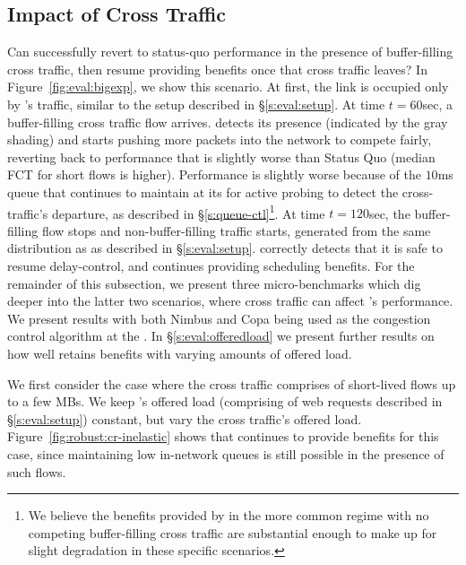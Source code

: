 \subsection{Impact of Cross Traffic}\label{s:robust:cross}



Can \name successfully revert to status-quo performance in the presence of buffer-filling cross traffic, then resume providing benefits once that cross traffic leaves?
In Figure~\ref{fig:eval:bigexp}, we show this scenario.
At first, the link is occupied only by \name's traffic, similar to the setup described in \S\ref{s:eval:setup}.
At time $t=60$sec, a buffer-filling cross traffic flow arrives.
\name detects its presence (indicated by the gray shading) and starts pushing more packets into the network to compete fairly, reverting back to performance that is slightly worse than Status Quo (median FCT for short flows is \bigexpElasticSlowdownWorseness higher). 
Performance is slightly worse because of the $10$ms queue that \name continues to maintain at its \inbox for active probing to detect the cross-traffic's departure, as described in \S\ref{s:queue-ctl}\footnote{We believe the benefits provided by \name in the more common regime with no competing buffer-filling cross traffic are substantial enough to make up for slight degradation in these specific scenarios.}. 
At time $t=120$sec, the buffer-filling flow stops and non-buffer-filling traffic starts, generated from the same distribution as \name as described in \S\ref{s:eval:setup}.
\name correctly detects that it is safe to resume delay-control, and continues providing scheduling benefits.
For the remainder of this subsection, we present three micro-benchmarks which dig deeper into the latter two scenarios, where cross traffic can affect \name's performance. 
We present results with both Nimbus and Copa being used as the congestion control algorithm at the \inbox. 
In \S\ref{s:eval:offeredload} we present further results on how well \name retains benefits with varying amounts of offered load.


 We first consider the case where the cross traffic comprises of short-lived flows up to a few MBs.
We keep \name's offered load (comprising of web requests described in \S\ref{s:eval:setup}) constant, but vary the cross traffic's offered load.
Figure~\ref{fig:robust:cr-inelastic} shows that \name continues to provide benefits for this case, since maintaining low in-network queues is still possible in the presence of such flows.

